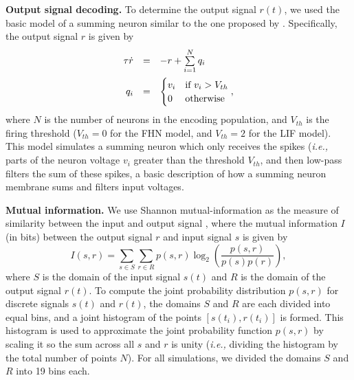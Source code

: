 \documentclass[12pt]{article}
\begin{document}
\textbf{Output signal decoding.} To determine the output signal $r(t)$, we used the basic model of a summing neuron similar to the one proposed by \cite{Stocks2001}. Specifically, the output signal $r$ is given by
\begin{equation}
  \begin{array}{rcl}
    \tau \dot{r} & = & -r + \sum\limits_{i=1}^N q_i \vspace{0.5em}\\
    q_i & = & \begin{cases} v_i & \text{if } v_i > V_{th} \\ 0 & \text{otherwise} \end{cases},
  \end{array}
\end{equation}
where $N$ is the number of neurons in the encoding population, and $V_{th}$ is the firing threshold ($V_{th} = 0$ for the FHN model, and $V_{th} = 2$ for the LIF model). This model simulates a summing neuron which only receives the spikes (\emph{i.e.,} parts of the neuron voltage $v_i$ greater than the threshold $V_{th}$, and then low-pass filters the sum of these spikes, a basic description of how a summing neuron membrane sums and filters input voltages.

\textbf{Mutual information.} We use Shannon mutual-information as the measure of similarity between the input and output signal \citep{Heneghan1996,Stocks2001}, where the mutual information $I$ (in bits) between the output signal $r$ and input signal $s$ is given by
\begin{equation}
  I(s,r) = \sum\limits_{s \in S} \sum\limits_{r \in R} p(s,r) \log_2\left(\frac{p(s,r)}{p(s)p(r)}\right),
\end{equation}
where $S$ is the domain of the input signal $s(t)$ and $R$ is the domain of the output signal $r(t)$. To compute the joint probability distribution $p(s,r)$ for discrete signals $s(t)$ and $r(t)$, the domains $S$ and $R$ are each divided into equal bins, and a joint histogram of the points $[s(t_i),r(t_i)]$ is formed. This histogram is used to approximate the joint probability function $p(s,r)$ by scaling it so the sum across all $s$ and $r$ is unity (\emph{i.e.,} dividing the histogram by the total number of points $N$). For all simulations, we divided the domains $S$ and $R$ into 19 bins each.
\end{document}
